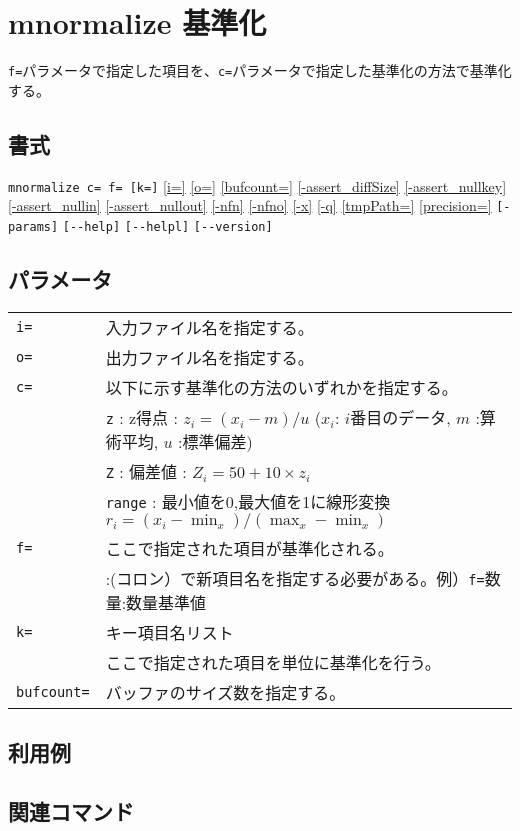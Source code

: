 
%

\section{mnormalize 基準化\label{sect:mnormalize}}
\verb|f=|パラメータで指定した項目を、\verb|c=|パラメータで指定した基準化の方法で基準化する。\\

\subsection*{書式}
\verb|mnormalize c= f= [k=]| 
\hyperref[sect:option_i]{[i=]}
\hyperref[sect:option_o]{[o=]}
\hyperref[sect:option_bufcount]{[bufcount=]} 
\hyperref[sect:option_assert_diffSize]{[-assert\_diffSize]}
\hyperref[sect:option_assert_nullkey]{[-assert\_nullkey]}
\hyperref[sect:option_assert_nullin]{[-assert\_nullin]}
\hyperref[sect:option_assert_nullout]{[-assert\_nullout]}
\hyperref[sect:option_nfn]{[-nfn]} 
\hyperref[sect:option_nfno]{[-nfno]}  
\hyperref[sect:option_x]{[-x]}
\hyperref[sect:option_q]{[-q]}
\hyperref[sect:option_option_tmppath]{[tmpPath=]}
\hyperref[sect:option_precision]{[precision=]}
\verb|[-params]|
\verb|[--help]|
\verb|[--helpl]|
\verb|[--version]|\\

\subsection*{パラメータ}
\begin{table}[htbp]
{\small
\begin{tabular}{ll}
\verb|i=|    & 入力ファイル名を指定する。\\
\verb|o=|    & 出力ファイル名を指定する。\\
\verb|c=|    & 以下に示す基準化の方法のいずれかを指定する。\\
             & \verb|z| : z得点 : $z_i=(x_i-m)/u$ ($x_i$: $i$番目のデータ, $m$ :算術平均, $u$ :標準偏差)\\
             & \verb|Z| : 偏差値 : $Z_i=50+10\times z_i$\\
             & \verb|range| : 最小値を0,最大値を1に線形変換 $r_i=(x_i-\min_x)/(\max_x-\min_x)$\\
\verb|f=|    & ここで指定された項目が基準化される。\\
             & :(コロン）で新項目名を指定する必要がある。例）\verb|f=|数量:数量基準値\\
\verb|k=|    & キー項目名リスト\\
             & ここで指定された項目を単位に基準化を行う。 \\
\verb|bufcount=| & バッファのサイズ数を指定する。 \\
\end{tabular} 
}
\end{table} 

\subsection*{利用例}

\subsection*{関連コマンド}

%
